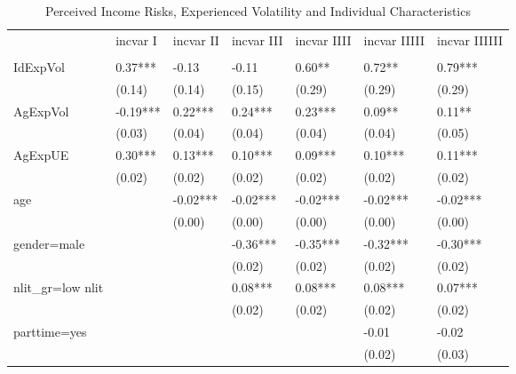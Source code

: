 
\begin{table}[p]
\centering
\begin{adjustbox}{width=\textwidth}
\begin{threeparttable}
\caption{Perceived Income Risks, Experienced Volatility and Individual Characteristics}
\label{micro_reg}\begin{tabular}{lllllll}
\toprule
{} &  incvar I & incvar II & incvar III & incvar IIII & incvar IIIII & incvar IIIIII \\
                    &           &           &            &             &              &               \\
\midrule
IdExpVol            &   0.37*** &     -0.13 &      -0.11 &      0.60** &       0.72** &       0.79*** \\
                    &    (0.14) &    (0.14) &     (0.15) &      (0.29) &       (0.29) &        (0.29) \\
AgExpVol            &  -0.19*** &   0.22*** &    0.24*** &     0.23*** &       0.09** &        0.11** \\
                    &    (0.03) &    (0.04) &     (0.04) &      (0.04) &       (0.04) &        (0.05) \\
AgExpUE             &   0.30*** &   0.13*** &    0.10*** &     0.09*** &      0.10*** &       0.11*** \\
                    &    (0.02) &    (0.02) &     (0.02) &      (0.02) &       (0.02) &        (0.02) \\
age                 &           &  -0.02*** &   -0.02*** &    -0.02*** &     -0.02*** &      -0.02*** \\
                    &           &    (0.00) &     (0.00) &      (0.00) &       (0.00) &        (0.00) \\
gender=male         &           &           &   -0.36*** &    -0.35*** &     -0.32*** &      -0.30*** \\
                    &           &           &     (0.02) &      (0.02) &       (0.02) &        (0.02) \\
nlit\_gr=low nlit    &           &           &    0.08*** &     0.08*** &      0.08*** &       0.07*** \\
                    &           &           &     (0.02) &      (0.02) &       (0.02) &        (0.02) \\
parttime=yes        &           &           &            &             &        -0.01 &         -0.02 \\
                    &           &           &            &             &       (0.02) &        (0.03) \\

\end{tabular}
\end{threeparttable}
\end{adjustbox}
\end{table}
